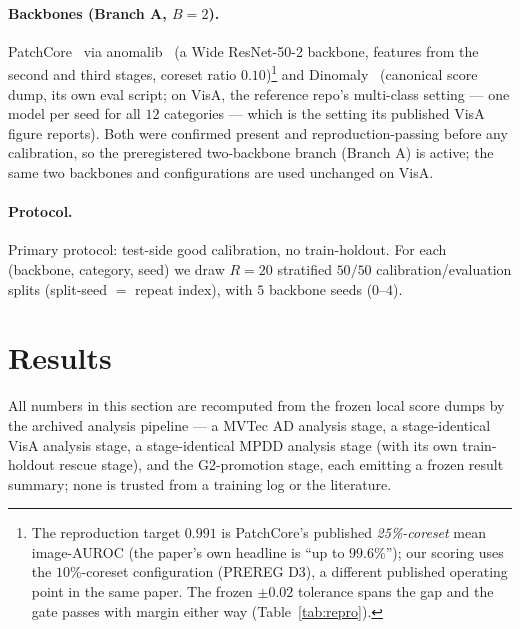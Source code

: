 \documentclass[11pt]{article}
\begin{document}
\paragraph{Backbones (Branch A, $B=2$).} PatchCore~\citep{roth2022patchcore} via
anomalib~\citep{akcay2022anomalib} (a Wide ResNet-50-2 backbone, features from the second and
third stages, coreset ratio $0.10$)\footnote{The reproduction target $0.991$ is PatchCore's published
\emph{25\%-coreset} mean image-AUROC (the paper's own headline is ``up to $99.6\%$''); our
scoring uses the $10\%$-coreset configuration (PREREG D3), a different published operating point
in the same paper. The frozen $\pm 0.02$ tolerance spans the gap and the gate passes with margin
either way (Table~\ref{tab:repro}).} and Dinomaly~\citep{guo2025dinomaly} (canonical score dump,
its own eval script; on VisA, the reference repo's multi-class setting --- one model per seed for
all $12$ categories --- which is the setting its published VisA figure reports). Both were
confirmed present and reproduction-passing before any calibration, so the preregistered
two-backbone branch (Branch A) is active; the same two backbones and configurations are used
unchanged on VisA.
\paragraph{Protocol.} Primary protocol: test-side good calibration, no
train-holdout. For each (backbone, category, seed) we draw $R=20$ stratified $50/50$
calibration/evaluation splits (split-seed $=$ repeat index), with $5$ backbone seeds ($0$--$4$).

\section{Results}
\label{sec:results}

All numbers in this section are recomputed from the frozen local score dumps by the archived
analysis pipeline --- a MVTec AD analysis stage, a stage-identical VisA analysis stage, a
stage-identical MPDD analysis stage (with its own train-holdout rescue stage), and the
G2-promotion stage, each emitting a frozen result summary; none is trusted from a training log or
the literature.
\end{document}

